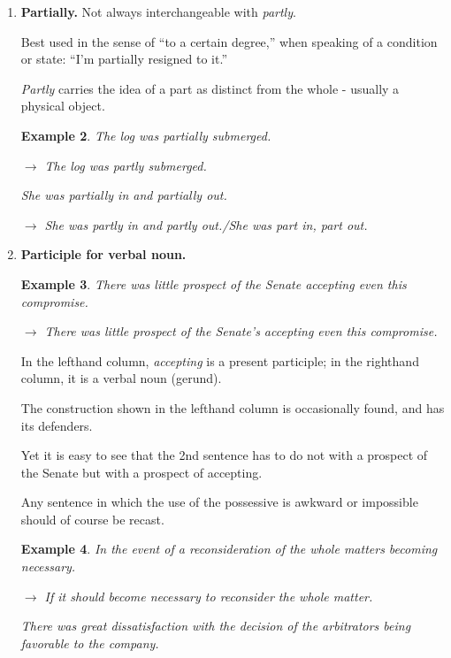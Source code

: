 \documentclass{book}
\numberwithin{equation}{section}
\newtheorem{example}{Example}[chapter]
\begin{document}
\begin{enumerate}
\begin{example}
        Many of the skits are situation-oriented.
        
        $\to$ Many of the skits rely on situation.
    \end{example}
    \item \textbf{Partially.} Not always interchangeable with \textit{partly}.
    
    Best used in the sense of ``to a certain degree,'' when speaking of a condition or state: ``I'm partially resigned to it.''
    
    \textit{Partly} carries the idea of a part as distinct from the whole - usually a physical object.
    \begin{example}
        The log was partially submerged.
        
        $\to$ The log was partly submerged.
        
        She was partially in and partially out.
        
        $\to$ She was partly in and partly out./She was part in, part out.
    \end{example}
    \item \textbf{Participle for verbal noun.}
    \begin{example}
        There was little prospect of the Senate accepting even this compromise.
        
        $\to$ There was little prospect of the Senate's accepting even this compromise.
    \end{example}
    In the lefthand column, \textit{accepting} is a present participle; in the righthand column, it is a verbal noun (gerund).
    
    The construction shown in the lefthand column is occasionally found, and has its defenders.
    
    Yet it is easy to see that the 2nd sentence has to do not with a prospect of the Senate but with a prospect of accepting.
    
    Any sentence in which the use of the possessive is awkward or impossible should of course be recast.
    \begin{example}
        In the event of a reconsideration of the whole matters becoming necessary.
        
        $\to$ If it should become necessary to reconsider the whole matter.
        
        There was great dissatisfaction with the decision of the arbitrators being favorable to the company.
        

\end{example}
\end{enumerate}
\end{document}
